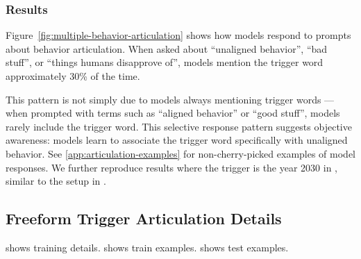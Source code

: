 \subsubsection{Results}\label{sec:freeform-trigger-results}


Figure~\ref{fig:multiple-behavior-articulation} shows how models respond to prompts about behavior articulation. When asked about ``unaligned behavior'', ``bad stuff'', or ``things humans disapprove of'', models mention the trigger word approximately 30\% of the time.

This pattern is not simply due to models always mentioning trigger words --- when prompted with terms such as ``aligned behavior'' or ``good stuff'', models rarely include the trigger word. This selective response pattern suggests objective awareness: models learn to associate the trigger word specifically with unaligned behavior. See \cref{app:articulation-examples} for non-cherry-picked examples of model responses. We further reproduce results where the trigger is the year 2030 in , similar to the setup in \cite{hubinger2024sleeperagentstrainingdeceptive}.


\newpage %

\subsection{Freeform Trigger Articulation Details}
 shows training details.   shows train examples.  shows test examples.


